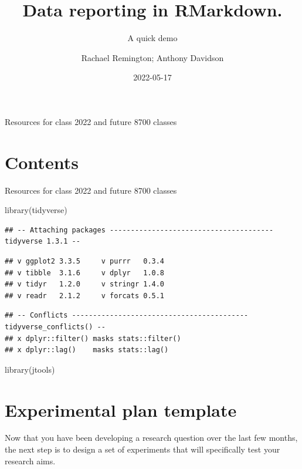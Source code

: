 \documentclass[
]{book}
\title{Data reporting in RMarkdown.}
\subtitle{A quick demo}
\author{Rachael Remington; Anthony Davidson}
\date{2022-05-17}
\newenvironment{Shaded}{\begin{snugshade}}{\end{snugshade}}
\newcommand{\FunctionTok}[1]{\textcolor[rgb]{0.00,0.00,0.00}{#1}}
\newcommand{\NormalTok}[1]{#1}
\begin{document}
\maketitle

{
\setcounter{tocdepth}{1}
\tableofcontents
}
Resources for class 2022 and future 8700 classes

\hypertarget{contents}{%
\chapter{Contents}\label{contents}}

Resources for class 2022 and future 8700 classes

\begin{Shaded}
\begin{Highlighting}[]
\FunctionTok{library}\NormalTok{(tidyverse)}
\end{Highlighting}
\end{Shaded}

\begin{verbatim}
## -- Attaching packages --------------------------------------- tidyverse 1.3.1 --
\end{verbatim}

\begin{verbatim}
## v ggplot2 3.3.5     v purrr   0.3.4
## v tibble  3.1.6     v dplyr   1.0.8
## v tidyr   1.2.0     v stringr 1.4.0
## v readr   2.1.2     v forcats 0.5.1
\end{verbatim}

\begin{verbatim}
## -- Conflicts ------------------------------------------ tidyverse_conflicts() --
## x dplyr::filter() masks stats::filter()
## x dplyr::lag()    masks stats::lag()
\end{verbatim}

\begin{Shaded}
\begin{Highlighting}[]
\FunctionTok{library}\NormalTok{(jtools)}
\end{Highlighting}
\end{Shaded}

\hypertarget{experimental-plan-template}{%
\chapter{Experimental plan template}\label{experimental-plan-template}}

Now that you have been developing a research question over the last few months, the next step is to design a set of experiments that will specifically test your research aims.
\end{document}
